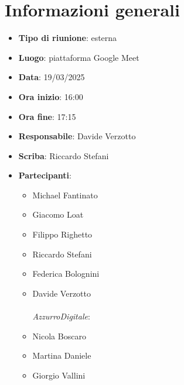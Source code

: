 


\section{Informazioni generali}

\begin{itemize}
    \item \textbf{Tipo di riunione}: esterna
    \item \textbf{Luogo}: piattaforma Google Meet
    \item \textbf{Data}: 19/03/2025
    \item \textbf{Ora inizio}: 16:00
    \item \textbf{Ora fine}: 17:15
    \item \textbf{Responsabile}: Davide Verzotto
    \item \textbf{Scriba}: Riccardo Stefani
    \item \textbf{Partecipanti}:
    \begin{itemize}
        \item Michael Fantinato
        \item Giacomo Loat
        \item Filippo Righetto
        \item Riccardo Stefani
        \item Federica Bolognini
        \item Davide Verzotto \\ \\
        \emph{AzzurroDigitale}:
        \item Nicola Boscaro
        \item Martina Daniele
        \item Giorgio Vallini
    \end{itemize}
\end{itemize}
